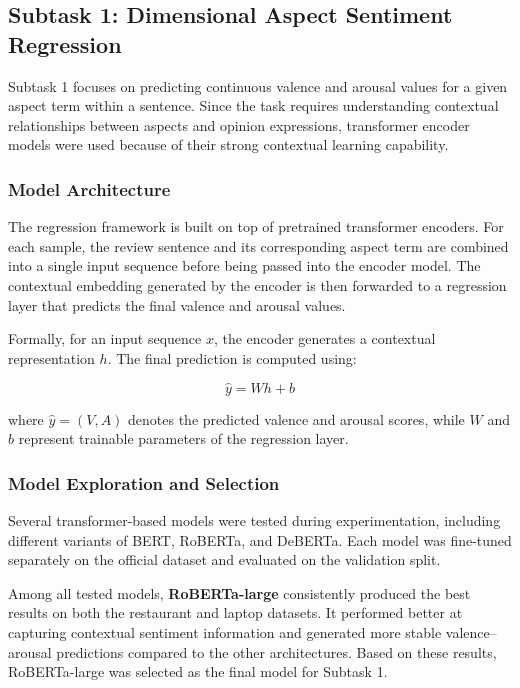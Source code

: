 \documentclass{article}
\begin{document}
\subsection{Subtask 1: Dimensional Aspect Sentiment Regression}

Subtask 1 focuses on predicting continuous valence and arousal values for a given aspect term within a sentence. Since the task requires understanding contextual relationships between aspects and opinion expressions, transformer encoder models were used because of their strong contextual learning capability.

\subsubsection{Model Architecture}

The regression framework is built on top of pretrained transformer encoders. For each sample, the review sentence and its corresponding aspect term are combined into a single input sequence before being passed into the encoder model. The contextual embedding generated by the encoder is then forwarded to a regression layer that predicts the final valence and arousal values.

Formally, for an input sequence $x$, the encoder generates a contextual representation $h$. The final prediction is computed using:

\begin{equation}
\hat{y} = W h + b
\end{equation}

where $\hat{y} = (V, A)$ denotes the predicted valence and arousal scores, while $W$ and $b$ represent trainable parameters of the regression layer.

\subsubsection{Model Exploration and Selection}

Several transformer-based models were tested during experimentation, including different variants of BERT, RoBERTa, and DeBERTa. Each model was fine-tuned separately on the official dataset and evaluated on the validation split.

Among all tested models, \textbf{RoBERTa-large} consistently produced the best results on both the restaurant and laptop datasets. It performed better at capturing contextual sentiment information and generated more stable valence–arousal predictions compared to the other architectures. Based on these results, RoBERTa-large was selected as the final model for Subtask 1.
\end{document}
